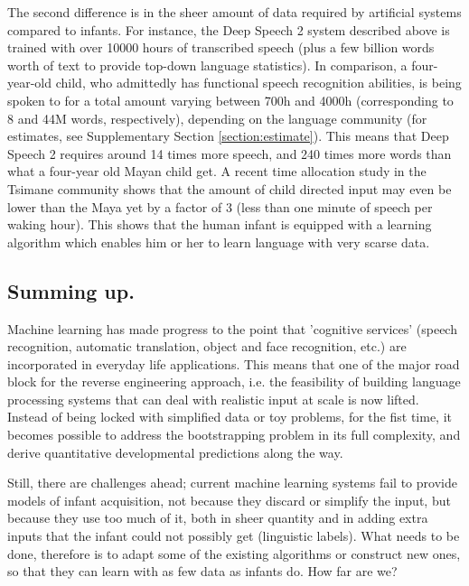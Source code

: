 \documentclass[jou,apacite]{apa6}
\begin{document}
The second difference is in the sheer amount of data required by artificial systems compared to infants. For instance, the Deep Speech 2 system described above is trained with over 10000 hours of transcribed speech (plus a few billion words worth of text to provide top-down language statistics).  In comparison, a four-year-old child, who admittedly has functional speech recognition abilities, is being spoken to for a total amount varying between 700h and 4000h  (corresponding to 8 and 44M words, respectively), depending on the language community (for estimates, see Supplementary Section \ref{section:estimate}). This means that Deep Speech 2 requires around 14 times more speech, and 240 times more words than what a four-year old Mayan child get. A recent time allocation study in the Tsimane community \cite{cristia:2017}  shows that the amount of child directed input may even be lower than the Maya yet by a factor of 3 (less than one minute of speech per waking hour). This shows that the human infant is equipped with a learning algorithm which enables him or her to learn language with very scarse data. %











\subsection{Summing up.}


Machine learning has made progress to the point that 'cognitive services' (speech recognition, automatic translation, object and face recognition, etc.) are incorporated in everyday life applications. This means that one of the major road block for the reverse engineering approach, i.e. the feasibility of building language processing systems that can deal with realistic input at scale is now lifted.  Instead of being locked with simplified data or toy problems, for the fist time, it becomes possible to address the bootstrapping problem in its full complexity, and derive quantitative developmental predictions along the way.

Still, there are challenges ahead; current machine learning systems fail to provide models of infant acquisition, not because they discard or simplify the input, but because they use too much of it, both in sheer quantity and in adding extra inputs that the infant could not possibly get (linguistic labels). What needs to be done, therefore is to adapt some of the existing algorithms or construct new ones, so that they can learn with as few data as infants do.  How far are we?%
\end{document}
